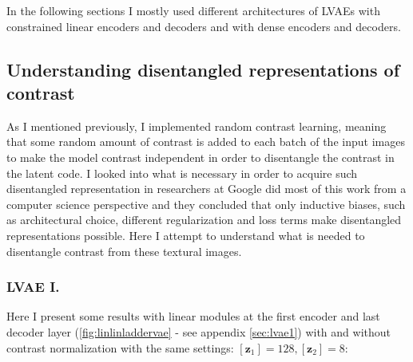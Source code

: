 \documentclass[12pt, english]{article}
\begin{document}
\par In the following sections I mostly used different architectures of LVAEs with constrained linear encoders and decoders and with dense encoders and decoders.

\vspace{7mm}

\subsection{Understanding disentangled representations of contrast}

\vspace{5mm}

\par As I mentioned previously, I implemented random contrast learning, meaning that some random amount of contrast is added to each batch of the input images to make the model contrast independent in order to disentangle the contrast in the latent code. I looked into what is necessary in order to acquire such disentangled representation in \cite{locatello2018challenging} researchers at Google did most of this work from a computer science perspective and they concluded that only inductive biases, such as architectural choice, different regularization and loss terms make disentangled representations possible. Here I attempt to understand what is needed to disentangle contrast from these textural images.

\vspace{4mm}

\subsubsection{LVAE I.}

\vspace{4mm}

\par Here I present some results with linear modules at the first encoder and last decoder layer (\ref{fig:linlinladdervae} - see appendix \ref{sec:lvae1}) with and without contrast normalization with the same settings: $[\bm{z}_{1}] = 128, [\bm{z}_{2}] = 8$:

\vspace{4mm}
\end{document}
